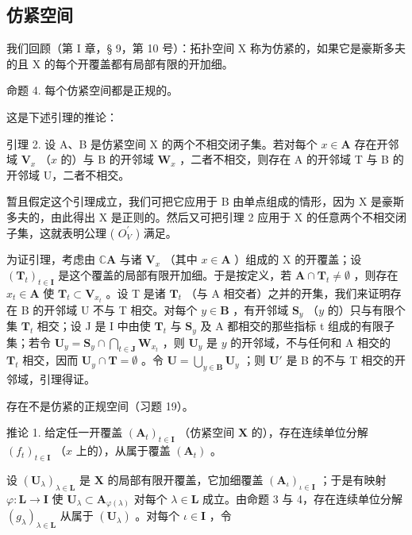 \subsection{仿紧空间}

我们回顾（第 I 章，§ 9，第 10 号）：拓扑空间 X 称为仿紧的，如果它是豪斯多夫的且 X 的每个开覆盖都有局部有限的开加细。

命题 4. 每个仿紧空间都是正规的。

这是下述引理的推论：

引理 2. 设 A、B 是仿紧空间 X 的两个不相交闭子集。若对每个 \(x \in \mathbf{A}\) 存在开邻域 \(\mathbf{V}_x\) （\(x\) 的）与 B 的开邻域 \(\mathbf{W}_x\) ，二者不相交，则存在 A 的开邻域 T 与 B 的开邻域 U，二者不相交。

暂且假定这个引理成立，我们可把它应用于 B 由单点组成的情形，因为 X 是豪斯多夫的，由此得出 X 是正则的。然后又可把引理 2 应用于 X 的任意两个不相交闭子集，这就表明公理 ( \(O_{V}^{\prime}\) ) 满足。

为证引理，考虑由 \(\mathbb{C}\mathbf{A}\) 与诸 \(\mathbf{V}_x\) （其中 \(x \in \mathbf{A}\) ）组成的 X 的开覆盖；设 \((\mathbf{T}_t)_{t \in \mathbf{I}}\) 是这个覆盖的局部有限开加细。于是按定义，若 \(\mathbf{A} \cap \mathbf{T}_t \neq \emptyset\) ，则存在 \(x_t \in \mathbf{A}\) 使 \(\mathbf{T}_t \subset \mathbf{V}_{x_t}\) 。设 T 是诸 \(\mathbf{T}_t\) （与 A 相交者）之并的开集，我们来证明存在 B 的开邻域 U 不与 T 相交。对每个 \(y \in \mathbf{B}\) ，有开邻域 \(\mathbf{S}_y\) （\(y\) 的）只与有限个集 \(\mathbf{T}_t\) 相交；设 J 是 I 中由使 \(\mathbf{T}_t\) 与 \(\mathbf{S}_y\) 及 A 都相交的那些指标 t 组成的有限子集；若令 \(\mathbf{U}_y = \mathbf{S}_y \cap \bigcap_{t \in \mathbf{J}} \mathbf{W}_{x_t}\) ，则 \(\mathbf{U}_y\) 是 \(y\) 的开邻域，不与任何和 A 相交的 \(\mathbf{T}_t\) 相交，因而 \(\mathbf{U}_y \cap \mathbf{T} = \emptyset\) 。令 \(\mathbf{U} = \bigcup_{y \in \mathbf{B}} \mathbf{U}_y\) ；则 \(\mathbf{U}'\) 是 B 的不与 T 相交的开邻域，引理得证。

存在不是仿紧的正规空间（习题 19）。

推论 1. 给定任一开覆盖 \((\mathbf{A}_t)_{t \in \mathbf{I}}\) （仿紧空间 \(\mathbf{X}\) 的），存在连续单位分解 \((f_t)_{t \in \mathbf{I}}\) （\(x\) 上的），从属于覆盖 \((\mathbf{A}_t)\) 。

设 \((\mathbf{U}_{\lambda})_{\lambda \in \mathbf{L}}\) 是 \(\mathbf{X}\) 的局部有限开覆盖，它加细覆盖 \((\mathbf{A}_{\iota})_{\iota \in \mathbf{I}}\) ；于是有映射 \(\varphi : \mathbf{L} \to \mathbf{I}\) 使 \(\mathbf{U}_{\lambda} \subset \mathbf{A}_{\varphi(\lambda)}\) 对每个 \(\lambda \in \mathbf{L}\) 成立。由命题 3 与 4，存在连续单位分解 \((g_{\lambda})_{\lambda \in \mathbf{L}}\) 从属于 \((\mathbf{U}_{\lambda})\) 。对每个 \(\iota \in \mathbf{I}\) ，令

